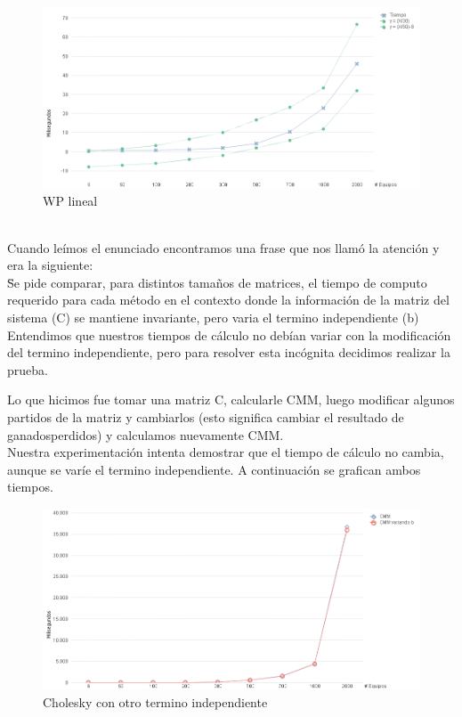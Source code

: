 \begin{figure}[H]
\centering
\includegraphics[width=1\textwidth]{IMG/wp lineal.png}
\caption{WP lineal}
\label{fig:WP lineal}
\end{figure}

\\

Cuando leímos el enunciado encontramos una frase que nos llamó la atención y era la siguiente: \\

\"Se pide comparar, para distintos tamaños de matrices, el tiempo de computo requerido para cada método en el contexto donde la información de la matriz del sistema (C) se mantiene invariante, 
pero varia el termino independiente (b)\"\\

Entendimos que nuestros tiempos de cálculo no debían variar con la modificación del termino independiente, pero para resolver esta incógnita decidimos realizar la prueba.

Lo que hicimos fue tomar una matriz C, calcularle CMM, luego modificar algunos partidos de la matriz y cambiarlos (esto significa cambiar el resultado de ganados\/perdidos) y calculamos 
nuevamente CMM. \\

Nuestra experimentación intenta demostrar que el tiempo de cálculo no cambia, aunque se varíe el termino independiente.
A continuación se grafican ambos tiempos.\\

\begin{figure}[H]
\centering
\includegraphics[width=1\textwidth]{IMG/Cholesky con otro termino independiente.png}
\caption{Cholesky con otro termino independiente}
\label{fig:Cholesky con otro termino independiente}
\end{figure}

